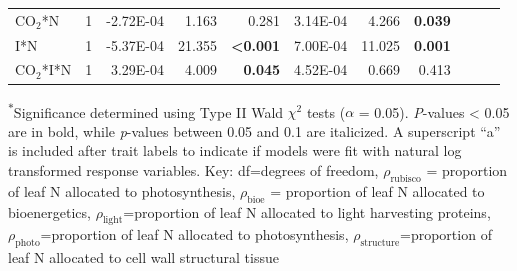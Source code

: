 \begin{landscape}
\begin{table}
{\begin{tabular}{p{3cm}p{0.5cm}p{1.75cm}p{1.5cm}p{1.5cm}p{1.75cm}p{1.5cm}p{1.5cm}p{1.75cm}p{1.5cm}p{1.5cm}}
            CO$_2$*N & \multicolumn{1}{r}{1}
            & \multicolumn{1}{r}{-2.72E-04}     & \multicolumn{1}{r}{1.163}         & \multicolumn{1}{r}{0.281}
            & \multicolumn{1}{r}{3.14E-04}      & \multicolumn{1}{r}{4.266}         & \multicolumn{1}{r}{\textbf{0.039}}
            & \multicolumn{1}{r}{}              & \multicolumn{1}{r}{}              & \multicolumn{1}{r}{} 
            \\

            I*N & \multicolumn{1}{r}{1}
            & \multicolumn{1}{r}{-5.37E-04}     & \multicolumn{1}{r}{21.355}        & \multicolumn{1}{r}{\textbf{<0.001}}
            & \multicolumn{1}{r}{7.00E-04}      & \multicolumn{1}{r}{11.025}        & \multicolumn{1}{r}{\textbf{0.001}}
            & \multicolumn{1}{r}{}              & \multicolumn{1}{r}{}              & \multicolumn{1}{r}{} 
            \\

            CO$_2$*I*N & \multicolumn{1}{r}{1}
            & \multicolumn{1}{r}{3.29E-04}      & \multicolumn{1}{r}{4.009}         & \multicolumn{1}{r}{\textbf{0.045}}
            & \multicolumn{1}{r}{4.52E-04}      & \multicolumn{1}{r}{0.669}         & \multicolumn{1}{r}{0.413}
            & \multicolumn{1}{r}{}              & \multicolumn{1}{r}{}              & \multicolumn{1}{r}{} 
            \\
            \hline
    \end{tabular}}
    \label{tab:table5.3}
    \end{table}
\begin{singlespace}
    \noindent \textsuperscript{$*$}Significance determined using Type II Wald $\chi^{2}$ tests ($\alpha$ = 0.05). \textit{P}-values < 0.05 are in bold, while \textit{p}-values between 0.05 and 0.1 are italicized. A superscript “a” is included after trait labels to indicate if models were fit with natural log transformed response variables. Key: df=degrees of freedom, $\rho_\mathrm{rubisco}$ = proportion of leaf N allocated to photosynthesis, $\rho_\mathrm{bioe}$ = proportion of leaf N allocated to bioenergetics, $\rho_\mathrm{light}$=proportion of leaf N allocated to light harvesting proteins, $\rho_\mathrm{photo}$=proportion of leaf N allocated to photosynthesis, $\rho_\mathrm{structure}$=proportion of leaf N allocated to cell wall structural tissue
\end{singlespace}
\end{landscape}
\clearpage

